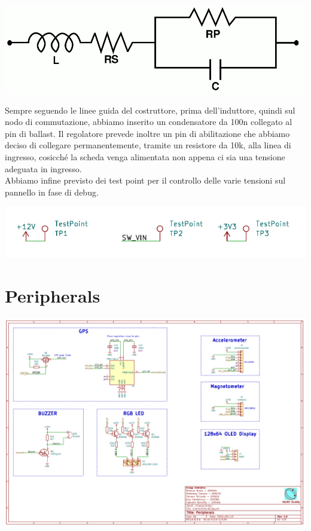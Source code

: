 \begin{center}
\includegraphics[scale=0.8]{figures/image37.png}
\captionsetup{type=figure}
\end{center}

\noindent Sempre seguendo le linee guida del costruttore, prima dell’induttore, 
quindi sul nodo di commutazione, abbiamo inserito un condensatore da 100n collegato al pin di ballast.
Il regolatore prevede inoltre un pin di abilitazione che abbiamo deciso di collegare permanentemente, 
tramite un resistore da 10k, alla linea di ingresso, cosicché la scheda venga alimentata non appena ci 
sia una tensione adeguata in ingresso.\\
Abbiamo infine previsto dei test point per il controllo delle varie
tensioni sul pannello in fase di debug.

\begin{center}
\includegraphics[scale=0.95]{figures/image78.png}
\captionsetup{type=figure}
\end{center}

\hypertarget{peripherals}{%
\section{Peripherals}\label{peripherals}}

\begin{center}
\includegraphics[scale=0.5]{figures/image15.png}
\captionsetup{type=figure}
\end{center}

